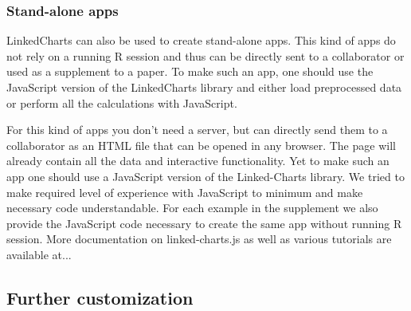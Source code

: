 \documentclass[twocolumn,10pt]{article}
\begin{document}
\subsubsection{Stand-alone apps}

LinkedCharts can also be used to create stand-alone apps. This kind of apps do not rely on a running R session and thus can be directly sent to a collaborator or used as a supplement to a paper. To make such an app, one should use the JavaScript version of the LinkedCharts library and either load preprocessed data or perform all the calculations with JavaScript. 

For this kind of apps you don't need a server, but can directly send them to a collaborator as an HTML file that can be opened in any browser. The page will already contain all the data and interactive functionality. Yet to make such an app one should use a JavaScript version of the Linked-Charts library. We tried to make required level of experience with JavaScript to minimum and make necessary code understandable. For each example in the supplement we also provide the JavaScript code necessary to create the same app without running R session. More documentation on linked-charts.js as well as various tutorials are available at...

\subsection{Further customization}

\begin{small} 
\balance

\end{small}
\end{document}
